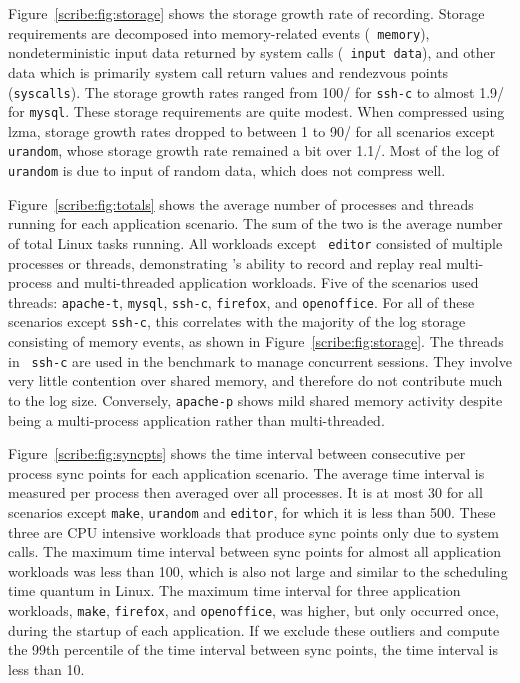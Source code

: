 Figure~\ref{scribe:fig:storage} shows the storage growth rate of recording.
Storage requirements are decomposed into memory-related events ({\tt
  memory}), nondeterministic input data returned by system calls ({\tt
  input data}), and other data which is primarily system call return
values and rendezvous points ({\tt syscalls}).  The storage growth
rates ranged from 100\KB{}/\secs{} for {\tt ssh-c} to almost
1.9\MB{}/\secs{} for {\tt mysql}.  These storage requirements are
quite modest.  When compressed using lzma, storage growth rates
dropped to between 1 to 90\KB{}/\secs{} for all scenarios except {\tt
  urandom}, whose storage growth rate 
remained a bit over 1.1\MB{}/\secs{}.  Most of the log of
{\tt urandom} is due to input of random data, which does not compress
well.  

Figure~\ref{scribe:fig:totals} shows the average number of processes and
threads running for each application scenario.  The sum of the two is
the average number of total Linux tasks running.  All workloads except {\tt
  editor} consisted of multiple processes or threads, demonstrating
\scribe{}'s ability to record and replay real multi-process and
multi-threaded application workloads.  Five of the scenarios used
threads: {\tt apache-t}, {\tt mysql}, {\tt ssh-c}, {\tt firefox}, and 
{\tt openoffice}. For all of these scenarios except {\tt ssh-c}, this
correlates with the majority of the log storage consisting of memory
events, as shown in Figure~\ref{scribe:fig:storage}.  The threads in {\tt
  ssh-c} are
used in the benchmark to manage
concurrent sessions.  They involve very little contention over shared
memory, and therefore do not contribute much to the log size.
Conversely, {\tt apache-p} shows mild shared memory activity despite
being a multi-process application rather than multi-threaded. 

Figure~\ref{scribe:fig:syncpts} shows the time interval between consecutive
per process sync points for each application scenario. The average
time interval is measured per process then averaged over all
processes.  It is at most 30\us{} for all scenarios except {\tt make},
{\tt urandom} and {\tt editor}, for which it is less than 500\us{}.
These three are CPU intensive workloads that produce sync points only
due to system calls.
The maximum time interval between sync points for almost all
application workloads was less than 100\ms{}, which is also not large
and similar to the scheduling time quantum in Linux.  The maximum time
interval for three application workloads, {\tt make}, {\tt firefox},
and {\tt openoffice}, was higher, but only occurred once,
during the startup of each application.  If we exclude these outliers
and compute the 99th percentile of the time interval between sync
points, the time interval is less than 10\ms{}.

